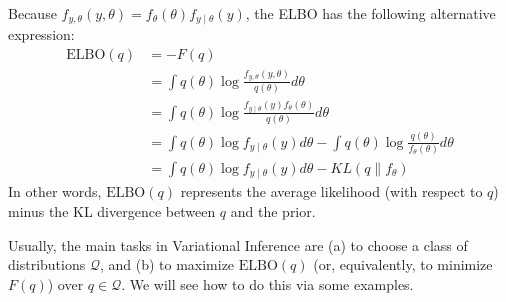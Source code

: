 \documentclass{scrartcl}
\newcommand{\Qcal}{{\mathcal{Q}}}
\begin{document}
Because $f_{y, \theta}(y, \theta) = f_{\theta}(\theta) f_{y \mid
  \theta}(y)$, the ELBO has the following alternative expression:
\begin{align}
  \text{ELBO}(q) &= -F(q) \nonumber \\ &= \int q(\theta) \log \frac{f_{y, \theta}(y,
  \theta)}{q(\theta)} d\theta \nonumber \\ &= \int q(\theta) \log \frac{f_{y\mid
                                   \theta}(y)
                                   f_{\theta}(\theta)}{q(\theta)}
                                   d\theta \nonumber \\
  &= \int q(\theta) \log f_{y \mid \theta}(y) d\theta - \int q(\theta)
    \log \frac{q(\theta)}{f_{\theta}(\theta)} d\theta \nonumber \\
  &= \int q(\theta) \log f_{y \mid \theta}(y) d\theta - KL(q \|
    f_{\theta}) \label{elbo_alt}
\end{align}
In other words, $\text{ELBO}(q)$ represents the average likelihood
(with respect to $q$) minus the KL divergence between $q$ and the
prior.

Usually, the main tasks in Variational Inference are (a) to choose a
class of distributions $\Qcal$, and (b) to maximize $\text{ELBO}(q)$
(or, equivalently, to minimize $F(q)$) over $q \in \Qcal$. We will see
how to do this via some examples.
\end{document}
